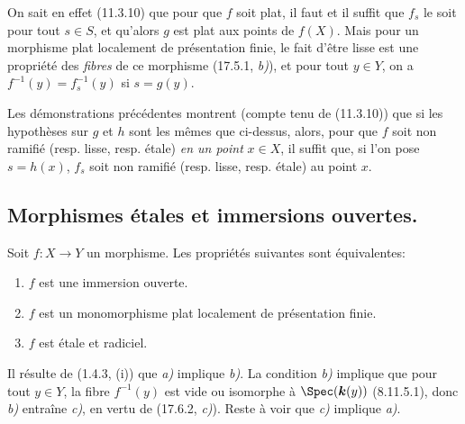 On sait en effet (11.3.10) que pour que $f$ soit plat, il faut et il suffit que $f_s$ le soit pour tout $s\in S$, et qu'alors $g$ est plat aux points de $f(X)$. Mais pour un morphisme plat localement de présentation finie, le fait d'être lisse est une propriété des \emph{fibres} de ce morphisme (17.5.1, \emph{b)}), et pour tout $y\in Y$, on a $f^{-1}(y)=f_s^{-1}(y)$ si $s=g(y)$.

\begin{remark}[17.8.3]
\label{IV.17.8.3}
Les démonstrations précédentes montrent (compte tenu de (11.3.10)) que si les hypothèses sur $g$ et $h$ sont les mêmes que ci-dessus, alors, pour que $f$ soit non ramifié (resp. lisse, resp. étale) \emph{en un point} $x\in X$, il suffit que, si l'on pose $s=h(x)$, $f_s$ soit non ramifié (resp. lisse, resp. étale) au point $x$.
\end{remark}

\subsection{Morphismes étales et immersions ouvertes.}
\label{IV.17.9}

\begin{theorem}[17.9.1]
\label{IV.17.9.1}
Soit $f:X\to Y$ un morphisme. Les propriétés suivantes sont équivalentes:
\begin{enumerate}
  \item[\textup{a)}] $f$ est une immersion ouverte.
  \item[\textup{b)}] $f$ est un monomorphisme plat localement de présentation finie.
  \item[\textup{c)}] $f$ est étale et radiciel.
\end{enumerate}
\end{theorem}

Il résulte de (1.4.3, (i)) que \emph{a)} implique \emph{b)}. La condition \emph{b)} implique que pour tout $y\in Y$, la fibre $f^{-1}(y)$ est vide ou isomorphe à $\Spec(\boldsymbol{k}(y))$ (8.11.5.1), donc \emph{b)} entraîne \emph{c)}, en vertu de (17.6.2, \emph{c)}). Reste à voir que \emph{c)} implique \emph{a)}.

